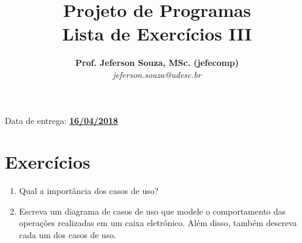 \documentclass[12pt]{article}
\title{Projeto de Programas \\ Lista de Exercícios III}
\author{\textbf{Prof. Jeferson Souza, MSc. (jefecomp)} \\[3mm]
\textit{jeferson.souza@udesc.br}}
\date{}
\begin{document}
\maketitle

\centering Data de entrega: \textbf{\underline{16/04/2018}}

\section*{Exercícios}

\begin{enumerate}
\itemsep 10mm

\item Qual a importância dos casos de uso?

\item Escreva um diagrama de casos de uso que modele o comportamento das operações realizadas em um caixa eletrônico. Além disso, também descreva cada um dos casos de uso.

\end{enumerate}
\end{document}
